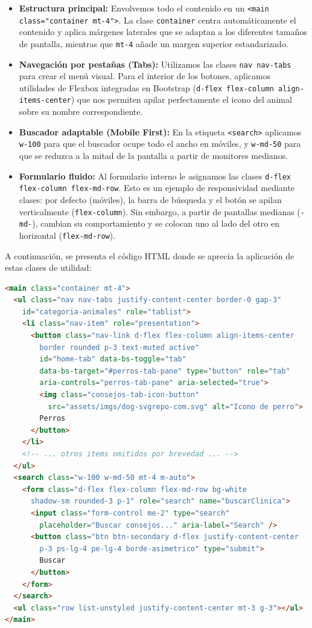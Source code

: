 \documentclass[11pt]{article}
\begin{document}
\begin{itemize}
    \item \textbf{Estructura principal:} Envolvemos todo el contenido en un \texttt{<main class="container mt-4">}. La clase \texttt{container} centra automáticamente el contenido y aplica márgenes laterales que se adaptan a los diferentes tamaños de pantalla, mientras que \texttt{mt-4} añade un margen superior estandarizado.
    \item \textbf{Navegación por pestañas (Tabs):} Utilizamos las clases \texttt{nav nav-tabs} para crear el menú visual. Para el interior de los botones, aplicamos utilidades de Flexbox integradas en Bootstrap (\texttt{d-flex flex-column align-items-center}) que nos permiten apilar perfectamente el icono del animal sobre su nombre correspondiente.
    \item \textbf{Buscador adaptable (Mobile First):} En la etiqueta \texttt{<search>} aplicamos \texttt{w-100} para que el buscador ocupe todo el ancho en móviles, y \texttt{w-md-50} para que se reduzca a la mitad de la pantalla a partir de monitores medianos.
    \item \textbf{Formulario fluido:} Al formulario interno le asignamos las clases \texttt{d-flex flex-column flex-md-row}. Esto es un ejemplo de responsividad mediante clases: por defecto (móviles), la barra de búsqueda y el botón se apilan verticalmente (\texttt{flex-column}). Sin embargo, a partir de pantallas medianas (\texttt{-md-}), cambian su comportamiento y se colocan uno al lado del otro en horizontal (\texttt{flex-md-row}).
\end{itemize}

A continuación, se presenta el código HTML donde se aprecia la aplicación de estas clases de utilidad:

\begin{lstlisting}[language=HTML, caption=Implementación de diseño responsivo mediante clases de Bootstrap]
<main class="container mt-4">
  <ul class="nav nav-tabs justify-content-center border-0 gap-3"
    id="categoria-animales" role="tablist">
    <li class="nav-item" role="presentation">
      <button class="nav-link d-flex flex-column align-items-center
        border rounded p-3 text-muted active"
        id="home-tab" data-bs-toggle="tab"
        data-bs-target="#perros-tab-pane" type="button" role="tab"
        aria-controls="perros-tab-pane" aria-selected="true">
        <img class="consejos-tab-icon-button"
          src="assets/imgs/dog-svgrepo-com.svg" alt="Icono de perro">
        Perros
      </button>
    </li>
    <!-- ... otros items omitidos por brevedad ... -->
  </ul>
  <search class="w-100 w-md-50 mt-4 m-auto">
    <form class="d-flex flex-column flex-md-row bg-white
      shadow-sm rounded-3 p-1" role="search" name="buscarClinica">
      <input class="form-control me-2" type="search"
        placeholder="Buscar consejos..." aria-label="Search" />
      <button class="btn btn-secondary d-flex justify-content-center
        p-3 ps-lg-4 pe-lg-4 borde-asimetrico" type="submit">
        Buscar
      </button>
    </form>
  </search>
  <ul class="row list-unstyled justify-content-center mt-3 g-3"></ul>
</main>
\end{lstlisting}
\end{document}
